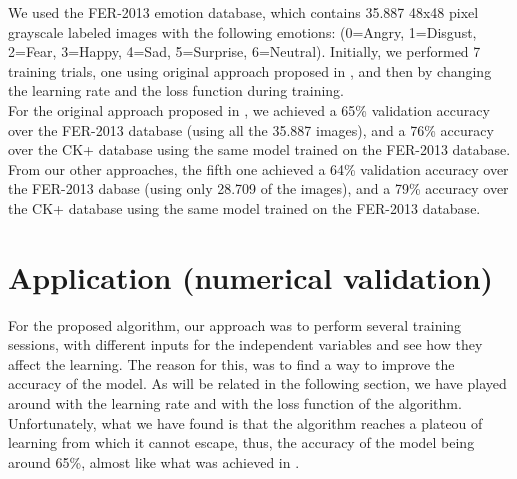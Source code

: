 \documentclass[runningheads,a4paper,11pt]{report}
\begin{document}
We used the FER-2013 emotion database, which contains 35.887 48x48 pixel grayscale labeled images with the following emotions: (0=Angry, 1=Disgust, 2=Fear, 3=Happy, 4=Sad, 5=Surprise, 6=Neutral). Initially, we performed 7 training trials, one using original approach proposed in \cite{Arriaga17}, and then by changing the learning rate and the loss function during training.\\
For the original approach proposed in \cite{Arriaga17}, we achieved a 65\% validation accuracy over the FER-2013 database (using all the 35.887 images), and a 76\% accuracy over the CK+ database using the same model trained on the FER-2013 database.\\
From our other approaches, the fifth one achieved a 64\% validation accuracy over the FER-2013 dabase (using only 28.709 of the images), and a 79\% accuracy over the CK+ database using the same model trained on the FER-2013 database.


\chapter{Application (numerical validation)}
\label{chapter:application}

For the proposed algorithm, our approach was to perform several training sessions, with different inputs for the independent variables and see how they affect the learning. The reason for this, was to find a way to improve the accuracy of the model. As will be related in the following section, we have played around with the learning rate and with the loss function of the algorithm. Unfortunately, what we have found is that the algorithm reaches a plateou of learning from which it cannot escape, thus, the accuracy of the model being around 65\%, almost like what was achieved in \cite{Arriaga17}.
\end{document}
